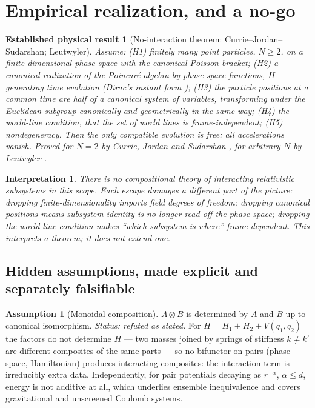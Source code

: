 \documentclass[12pt,a4paper]{article}
\theoremstyle{definition}
\newtheorem{assumption}[definition]{Assumption}
\theoremstyle{plain}
\theoremstyle{commentary}
\newtheorem{interpretation}[definition]{Interpretation}
\newtheorem{established}[definition]{Established physical result}
\begin{document}
\section{Empirical realization, and a no-go}

\begin{established}[No-interaction theorem: Currie--Jordan--Sudarshan; Leutwyler]
\label{estab:cjs}
Assume: (H1) finitely many point particles, $N\ge2$, on a finite-dimensional phase space with
the canonical Poisson bracket; (H2) a canonical realization of the Poincar\'e algebra by
phase-space functions, $H$ generating time evolution (Dirac's instant form \cite{Dirac1949});
(H3) the particle positions at a common time are half of a canonical system of variables,
transforming under the Euclidean subgroup canonically and geometrically in the same way;
(H4) the world-line condition, that the set of world lines is frame-independent;
(H5) nondegeneracy. Then the only compatible evolution is \emph{free}: all
accelerations vanish. Proved for $N=2$ by Currie, Jordan and Sudarshan \cite{CJS1963}, for
arbitrary $N$ by Leutwyler \cite{Leutwyler1965}.
\end{established}

\begin{interpretation}\label{interp:cjs}
There is no compositional theory of \emph{interacting relativistic subsystems} in this scope.
Each escape damages a different part of the picture: dropping finite-dimensionality imports
field degrees of freedom; dropping canonical positions means subsystem identity is no longer
read off the phase space; dropping the world-line condition makes ``which subsystem is where''
frame-dependent. This interprets a theorem; it does not extend one.
\end{interpretation}

\subsection*{Hidden assumptions, made explicit and separately falsifiable}

\begin{assumption}[Monoidal composition]\label{asm:monoidal}
$A\otimes B$ is determined by $A$ and $B$ up to canonical isomorphism. \emph{Status: refuted
as stated.} For $H=H_1+H_2+V(q_1,q_2)$ the factors do not determine $H$ --- two masses joined
by springs of stiffness $k\ne k'$ are different composites of the same parts --- so no
bifunctor on pairs (phase space, Hamiltonian) produces interacting composites: the interaction
term is irreducibly extra data. Independently, for pair potentials decaying as $r^{-\alpha}$,
$\alpha\le d$, energy is not additive at all, which underlies ensemble inequivalence
\cite{CampaDauxoisRuffo2009} and covers gravitational and unscreened Coulomb systems.
\end{assumption}
\end{document}
